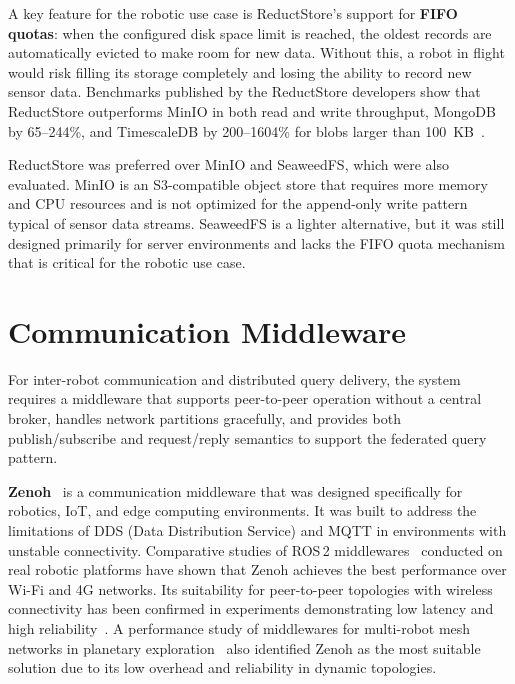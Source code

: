 A key feature for the robotic use case is ReductStore's support for \textbf{FIFO quotas}: when the configured disk space limit is reached, the oldest records are automatically evicted to make room for new data. Without this, a robot in flight would risk filling its storage completely and losing the ability to record new sensor data. Benchmarks published by the ReductStore developers show that ReductStore outperforms MinIO in both read and write throughput, MongoDB by 65--244\%, and TimescaleDB by 200--1604\% for blobs larger than 100~KB~\cite{reductstore2024benchmark}.

ReductStore was preferred over MinIO and SeaweedFS, which were also evaluated. MinIO is an S3-compatible object store that requires more memory and CPU resources and is not optimized for the append-only write pattern typical of sensor data streams. SeaweedFS is a lighter alternative, but it was still designed primarily for server environments and lacks the FIFO quota mechanism that is critical for the robotic use case.


\section{Communication Middleware} \label{sec:communication-middleware}

For inter-robot communication and distributed query delivery, the system requires a middleware that supports peer-to-peer operation without a central broker, handles network partitions gracefully, and provides both publish/subscribe and request/reply semantics to support the federated query pattern.

\textbf{Zenoh}~\cite{corsaro2023zenoh} is a communication middleware that was designed specifically for robotics, IoT, and edge computing environments. It was built to address the limitations of DDS (Data Distribution Service) and MQTT in environments with unstable connectivity. Comparative studies of ROS\,2 middlewares~\cite{zhang2024comparison} conducted on real robotic platforms have shown that Zenoh achieves the best performance over Wi-Fi and 4G networks. Its suitability for peer-to-peer topologies with wireless connectivity has been confirmed in experiments demonstrating low latency and high reliability~\cite{liang2023performance}. A performance study of middlewares for multi-robot mesh networks in planetary exploration~\cite{performance2025planetary} also identified Zenoh as the most suitable solution due to its low overhead and reliability in dynamic topologies.

